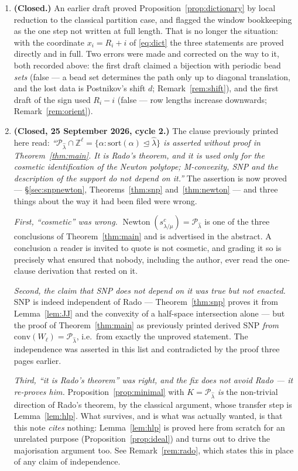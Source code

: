 \documentclass[11pt]{article}
\theoremstyle{plain}
\theoremstyle{definition}
\DeclareMathOperator{\Newton}{Newton}
\newcommand{\Z}{\mathbb{Z}}
\begin{document}
\begin{enumerate}
\item \textbf{(Closed.)} An earlier draft proved Proposition~\ref{prop:dictionary}
by local reduction to the classical partition case, and flagged the window bookkeeping as the
one step not written at full length. That is no longer the situation: with the coordinate
$x_i=R_i+i$ of \eqref{eq:dict} the three statements are proved directly and in full. Two errors
were made and corrected on the way to it, both recorded above: the first draft claimed a
bijection with periodic bead \emph{sets} (false --- a bead set determines the path only up to
diagonal translation, and the lost data is Postnikov's shift $d$; Remark~\ref{rem:shift}), and
the first draft of the sign used $R_i-i$ (false --- row lengths increase downwards;
Remark~\ref{rem:orient}).

\item \textbf{(Closed, 25 September 2026, cycle 2.)} The clause previously printed here read:
\emph{``$\mathcal{P}_{\hat\lambda}\cap\Z^{\ell}=\{\alpha:\mathrm{sort}(\alpha)
\trianglelefteq\hat\lambda\}$ is asserted without proof in Theorem~\ref{thm:main}. It is
Rado's theorem, and it is used only for the cosmetic identification of the Newton polytope;
M-convexity, SNP and the description of the support do not depend on it.''} The assertion is
now proved --- \S\ref{sec:snpnewton}, Theorems~\ref{thm:snp} and~\ref{thm:newton} --- and three
things about the way it had been filed were wrong.

\emph{First, ``cosmetic'' was wrong.} $\Newton(s^{c}_{\lambda/\mu})=\mathcal{P}_{\hat\lambda}$
is one of the three conclusions of Theorem~\ref{thm:main} and is advertised in the abstract. A
conclusion a reader is invited to quote is not cosmetic, and grading it so is precisely what
ensured that nobody, including the author, ever read the one-clause derivation that rested on
it.

\emph{Second, the claim that SNP does not depend on it was true but not enacted.} SNP is indeed
independent of Rado --- Theorem~\ref{thm:snp} proves it from Lemma~\ref{lem:JJ} and the
convexity of a half-space intersection alone --- but the proof of Theorem~\ref{thm:main} as
previously printed derived SNP \emph{from} $\mathrm{conv}(W_\ell)=\mathcal{P}_{\hat\lambda}$,
i.e.\ from exactly the unproved statement. The independence was asserted in this list and
contradicted by the proof three pages earlier.

\emph{Third, ``it is Rado's theorem'' was right, and the fix does not avoid Rado --- it
re-proves him.} Proposition~\ref{prop:minimal} with $K=\mathcal{P}_{\hat\lambda}$ \emph{is} the
non-trivial direction of Rado's theorem, by the classical argument, whose transfer step is
Lemma~\ref{lem:hlp}. What survives, and is what was actually wanted, is that this note
\emph{cites} nothing: Lemma~\ref{lem:hlp} is proved here from scratch for an unrelated purpose
(Proposition~\ref{prop:ideal}) and turns out to drive the majorisation argument too. See
Remark~\ref{rem:rado}, which states this in place of any claim of independence.


\end{enumerate}
\end{document}
